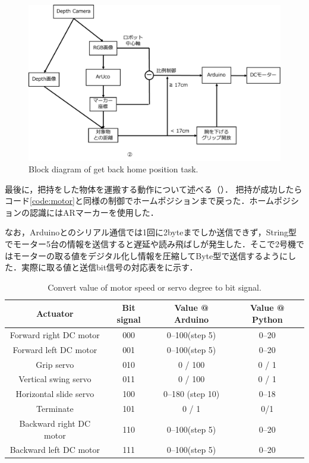 \begin{figure}
    \centering
    \includegraphics[width=0.7\linewidth]{figure/chapter4/2号機制御図_AR}
    \caption{Block diagram of get back home position task.}
    \label{fig:2号機AR}
\end{figure}

最後に，把持をした物体を運搬する動作について述べる（）．
把持が成功したらコード\ref{code:motor}と同様の制御でホームポジションまで戻った．ホームポジションの認識にはARマーカーを使用した．

なお，Arduinoとのシリアル通信では1回に2byteまでしか送信できず，String型でモーター5台の情報を送信すると遅延や読み飛ばしが発生した．そこで2号機ではモーターの取る値をデジタル化し情報を圧縮してByte型で送信するようにした．実際に取る値と送信bit信号の対応表をに示す．

\begin{table}
    \centering
    \caption{Convert value of motor speed or servo degree to bit signal.}
    \begin{tabular}{cccc}\toprule
        Actuator & Bit signal & Value @ Arduino & Value @ Python \\ \midrule
        Forward right DC motor & 000 & 0--100(step 5) & 0--20  \\ 
        Forward left DC motor & 001 & 0--100(step 5) & 0--20 \\ 
        Grip servo & 010 & 0 / 100 & 0 / 1\\ 
        Vertical swing servo & 011 & 0 / 100 & 0 / 1\\ 
        Horizontal slide servo & 100 & 0--180 (step 10) & 0--18 \\ 
        Terminate & 101 & 0 / 1 & 0/1 \\ 
        Backward right DC motor & 110 & 0--100(step 5) & 0--20 \\ 
        Backward left DC motor & 111 & 0--100(step 5) & 0--20 \\ \bottomrule
    \end{tabular} 
    \label{tab:2号機信号表}
\end{table}

